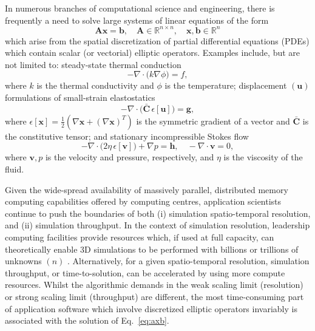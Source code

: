 \documentclass[]{siamart0216}
\newcommand{\cmat}[1]{\boldsymbol{#1}}
\newcommand{\dmat}[1]{\mathbf{#1}}
\newcommand{\cvec}[1]{\boldsymbol{#1}}
\newcommand{\dvec}[1]{\mathbf{#1}}
\begin{document}
In numerous branches of computational science and engineering, there is frequently a need to solve 
large systems of linear equations of the form
\begin{equation}
	\dmat A \dvec x = \dvec b, \quad \dmat A \in \mathbb R^{n \times n}, \quad \dvec x, \dvec b \in \mathbb R^n
	\label{eq:axb}
\end{equation}
which arise from the spatial discretization of partial differential equations (PDEs) which contain scalar (or vectorial) elliptic operators. 
Examples include, but are not limited to: steady-state thermal conduction
\begin{equation}
	- \nabla \cdot \bigl( k \nabla \phi \bigr) = f,
	\label{eq:poisson}
\end{equation}
where $k$ is the thermal conductivity and $\phi$ is the temperature; 
displacement $(\cvec u)$ formulations of small-strain elastostatics
\begin{equation}
	- \nabla \cdot \bigl( \bar{\cmat C} \, \epsilon[\cvec u] \bigr) = \cvec g,
	\label{eq:elasticity}
\end{equation}
where $\epsilon[\cvec x] = \tfrac{1}{2} \left( \nabla \cvec x + (\nabla \cvec x)^T \right)$ 
is the symmetric gradient of a vector and $\bar{\cmat{C}}$ is the constitutive tensor; 
and stationary incompressible Stokes flow
\begin{equation}
	- \nabla \cdot \bigl( 2 \eta \, {\epsilon}[\cvec v] \bigr) + \nabla p = \cvec h, \quad -\nabla \cdot \cvec v = 0,
	\label{eq:stokes}
\end{equation}
where $\cvec v, p$ is the velocity and pressure, respectively, and $\eta$ is the viscosity of the fluid.

Given the wide-spread availability of massively parallel, distributed memory computing capabilities 
offered by computing centres, application scientists continue to push the boundaries of 
both (i) simulation spatio-temporal resolution, and (ii) simulation throughput.
In the context of simulation resolution, leadership computing facilities provide resources which, if used at full capacity, 
can theoretically enable 3D simulations to be performed with billions or trillions of unknowns $(n)$ \cite{gmeiner2014parallel}. 
Alternatively, for a given spatio-temporal resolution, simulation throughput, or time-to-solution, 
can be accelerated by using more compute resources.
Whilst the algorithmic demands in the weak scaling limit (resolution) or strong scaling limit (throughput) are different, 
the most time-consuming part of application software which involve discretized elliptic operators invariably is associated 
with the solution of Eq.~\eqref{eq:axb}.
\end{document}
